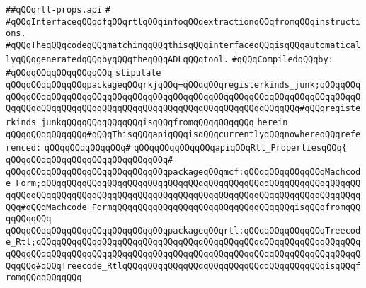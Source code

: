 \label{src/lib/compiler/back/low/treecode/rtl-props.api}
\verb|##qQQqrtl-props.api|\newline
\verb|#|\newline
\verb|#qQQqInterfaceqQQqofqQQqrtlqQQqinfoqQQqextractionqQQqfromqQQqinstructions.|\newline
\verb|#qQQqTheqQQqcodeqQQqmatchingqQQqthisqQQqinterfaceqQQqisqQQqautomaticallyqQQqgeneratedqQQqbyqQQqtheqQQqADLqQQqtool.|\newline
\newline
\verb|#qQQqCompiledqQQqby:|\newline
\verb|#qQQqqQQqqQQqqQQqqQQq|\newline
\newline
\newline
\verb|stipulate|\newline
\verb|qQQqqQQqqQQqqQQqpackageqQQqrkjqQQq=qQQqqQQqregisterkinds_junk;qQQqqQQqqQQqqQQqqQQqqQQqqQQqqQQqqQQqqQQqqQQqqQQqqQQqqQQqqQQqqQQqqQQqqQQqqQQqqQQqqQQqqQQqqQQqqQQqqQQqqQQqqQQqqQQqqQQqqQQqqQQqqQQqqQQqqQQq#qQQqregisterkinds_junkqQQqqQQqqQQqqQQqisqQQqfromqQQqqQQqqQQq|\newline
\verb|herein|\newline
\newline
\verb|qQQqqQQqqQQqqQQq#qQQqThisqQQqapiqQQqisqQQqcurrentlyqQQqnowhereqQQqreferenced:|\newline
\verb|qQQqqQQqqQQqqQQq#|\newline
\verb|qQQqqQQqqQQqqQQqapiqQQqRtl_PropertiesqQQq{|\newline
\verb|qQQqqQQqqQQqqQQqqQQqqQQqqQQqqQQq#|\newline
\verb|qQQqqQQqqQQqqQQqqQQqqQQqqQQqqQQqpackageqQQqmcf:qQQqqQQqqQQqqQQqMachcode_Form;qQQqqQQqqQQqqQQqqQQqqQQqqQQqqQQqqQQqqQQqqQQqqQQqqQQqqQQqqQQqqQQqqQQqqQQqqQQqqQQqqQQqqQQqqQQqqQQqqQQqqQQqqQQqqQQqqQQqqQQqqQQqqQQqqQQqqQQq#qQQqMachcode_FormqQQqqQQqqQQqqQQqqQQqqQQqqQQqqQQqqQQqisqQQqfromqQQqqQQqqQQq|\newline
\verb|qQQqqQQqqQQqqQQqqQQqqQQqqQQqqQQqpackageqQQqrtl:qQQqqQQqqQQqqQQqTreecode_Rtl;qQQqqQQqqQQqqQQqqQQqqQQqqQQqqQQqqQQqqQQqqQQqqQQqqQQqqQQqqQQqqQQqqQQqqQQqqQQqqQQqqQQqqQQqqQQqqQQqqQQqqQQqqQQqqQQqqQQqqQQqqQQqqQQqqQQqqQQqqQQq#qQQqTreecode_RtlqQQqqQQqqQQqqQQqqQQqqQQqqQQqqQQqqQQqqQQqisqQQqfromqQQqqQQqqQQq|\newline
